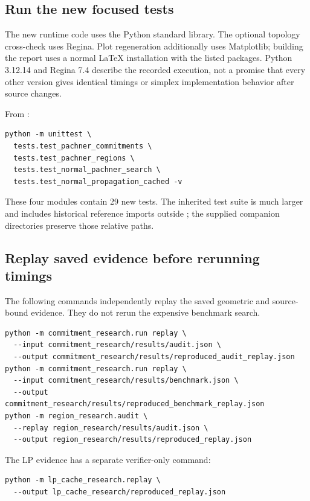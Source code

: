 \subsection{Run the new focused tests}

The new runtime code uses the Python standard library. The optional topology
cross-check uses Regina. Plot regeneration additionally uses Matplotlib;
building the report uses a normal \LaTeX{} installation with the listed
packages. Python 3.12.14 and Regina 7.4 describe the recorded execution, not
a promise that every other version gives identical timings or simplex
implementation behavior after source changes.

From :

\begin{lstlisting}
python -m unittest \
  tests.test_pachner_commitments \
  tests.test_pachner_regions \
  tests.test_normal_pachner_search \
  tests.test_normal_propagation_cached -v
\end{lstlisting}

These four modules contain 29 new tests. The inherited test suite is much
larger and includes historical reference imports outside ;
the supplied companion directories preserve those relative paths.

\subsection{Replay saved evidence before rerunning timings}

The following commands independently replay the saved geometric and
source-bound evidence. They do not rerun the expensive benchmark search.

\begin{lstlisting}
python -m commitment_research.run replay \
  --input commitment_research/results/audit.json \
  --output commitment_research/results/reproduced_audit_replay.json
python -m commitment_research.run replay \
  --input commitment_research/results/benchmark.json \
  --output commitment_research/results/reproduced_benchmark_replay.json
python -m region_research.audit \
  --replay region_research/results/audit.json \
  --output region_research/results/reproduced_replay.json
\end{lstlisting}

The LP evidence has a separate verifier-only command:

\begin{lstlisting}
python -m lp_cache_research.replay \
  --output lp_cache_research/reproduced_replay.json
\end{lstlisting}

